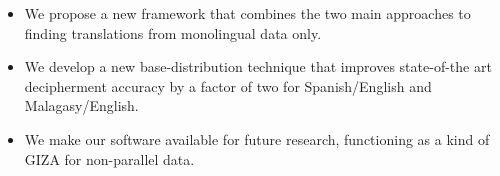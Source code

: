 \begin{itemize}
\item We propose a new framework that combines the two main approaches to finding translations from monolingual data only.

\item We develop a new base-distribution technique that improves state-of-the art decipherment accuracy by a factor of two for Spanish/English and Malagasy/English. 

\item We make our software available for future research, functioning as a kind of GIZA for non-parallel data.
\end{itemize}